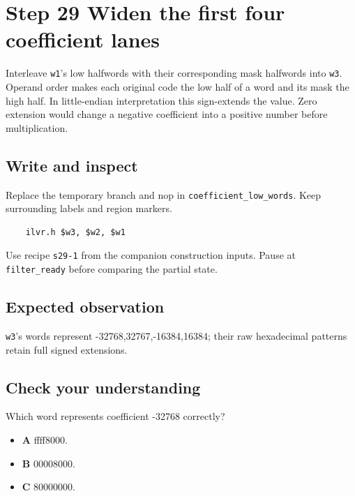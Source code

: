 \section{Step 29 Widen the first four coefficient lanes}\label{fir-s29}

Interleave \texttt{w1}’s low halfwords with their corresponding mask halfwords into \texttt{w3}. Operand order makes each original code the low half of a word and its mask the high half. In little-endian interpretation this sign-extends the value. Zero extension would change a negative coefficient into a positive number before multiplication.

\subsection{Write and inspect}
Replace the temporary branch and nop in \texttt{coefficient\_low\_words}. Keep surrounding labels and region markers.

\begin{verbatim}
    ilvr.h $w3, $w2, $w1
\end{verbatim}
Use recipe \texttt{s29-1} from the companion construction inputs. Pause at \texttt{filter\_ready} before comparing the partial state.

\subsection{Expected observation}
\texttt{w3}’s words represent -32768,32767,-16384,16384; their raw hexadecimal patterns retain full signed extensions.

\subsection{Check your understanding}
Which word represents coefficient -32768 correctly?

\begin{itemize}
  \item \textbf{A} ffff8000.
  \item \textbf{B} 00008000.
  \item \textbf{C} 80000000.
\end{itemize}
